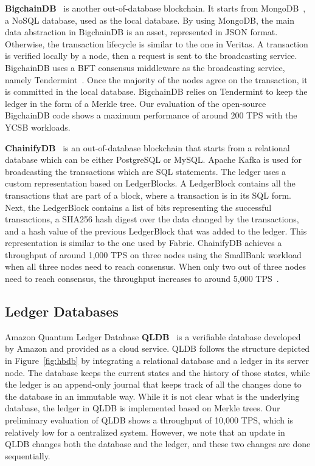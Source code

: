 \documentclass[11pt]{article}
\begin{document}
\textbf{BigchainDB}~\cite{bigchaindb_wp} is another out-of-database blockchain. It starts from MongoDB~\cite{mongodb}, a NoSQL database, used as the local database. By using MongoDB, the main data abstraction in BigchainDB is an asset, represented in JSON format. Otherwise, the transaction lifecycle is similar to the one in Veritas. A transaction is verified locally by a node, then a request is sent to the broadcasting service. BigchainDB uses a BFT consensus middleware as the broadcasting service, namely  Tendermint~\cite{tendermint_thesis}. Once the majority of the nodes agree on the transaction, it is committed in the local database. BigchainDB relies on Tendermint to keep the ledger in the form of a Merkle tree. Our evaluation of the open-source BigchainDB code shows a maximum performance of around 200 TPS with the YCSB workloads.


\textbf{ChainifyDB}~\cite{chainifydb} is an out-of-database blockchain that starts from a relational database which can be either PostgreSQL or MySQL. Apache Kafka is used for broadcasting the transactions which are SQL statements. The ledger uses a custom representation based on LedgerBlocks. A LedgerBlock contains all the transactions that are part of a block, where a transaction is in its SQL form. Next, the LedgerBlock contains a list of bits representing the successful transactions, a SHA256 hash digest over the data changed by the transactions, and a hash value of the previous LedgerBlock that was added to the ledger. This representation is similar to the one used by Fabric. ChainifyDB achieves a throughput of around 1,000 TPS on three nodes using the SmallBank workload when all three nodes need to reach consensus. When only two out of three nodes need to reach consensus, the throughput increases to around 5,000 TPS~\cite{chainifydb}.


\subsection{Ledger Databases}

Amazon Quantum Ledger Database \textbf{QLDB}~\cite{qldb} is a verifiable database developed by Amazon and provided as a cloud service. QLDB follows the structure depicted in Figure~\ref{fig:hbdb} by integrating a relational database and a ledger in its server node. The database keeps the current states and the history of those states, while the ledger is an append-only journal that keeps track of all the changes done to the database in an immutable way. While it is not clear what is the underlying database, the ledger in QLDB is implemented based on Merkle trees. Our preliminary evaluation of QLDB shows a throughput of 10,000 TPS, which is relatively low for a centralized system. However, we note that an update in QLDB changes both the database and the ledger, and these two changes are done sequentially. 
\end{document}
